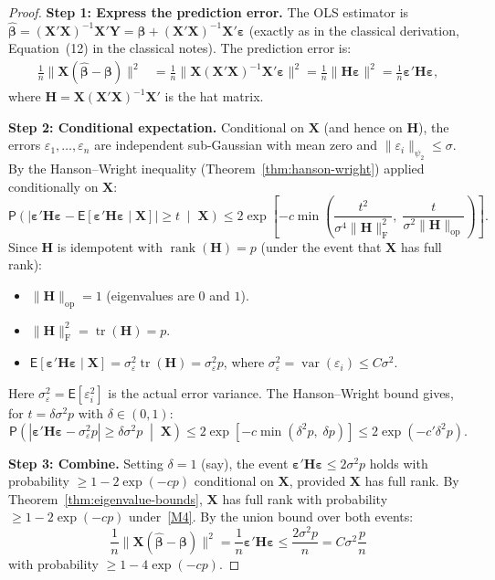 \documentclass[14pt]{extarticle}
\theoremstyle{plain}
\theoremstyle{definition}
\theoremstyle{remark}
\newcommand\expc{\mathsf{E}}
\newcommand\prb{\mathsf{P}}
\DeclareMathOperator\var{var}
\DeclareMathOperator\tr{tr}
\DeclareMathOperator\rank{rank}
\newcommand{\bX}{\mathbf{X}}
\newcommand{\bY}{\mathbf{Y}}
\def\bb{\boldsymbol{\beta}}
\newcommand{\be}{\boldsymbol{\varepsilon}}
\newcommand{\bH}{\mathbf{H}}
\newcommand{\hbb}{\hat{\boldsymbol{\beta}}}
\newcommand{\opnorm}[1]{\|#1\|_{\mathrm{op}}}
\newcommand{\fnorm}[1]{\|#1\|_{\mathrm{F}}}
\begin{document}
\begin{proof}
\textbf{Step 1: Express the prediction error.} The OLS estimator is $\hbb = (\bX'\bX)^{-1}\bX'\bY = \bb + (\bX'\bX)^{-1}\bX'\be$ (exactly as in the classical derivation, Equation~(12) in the classical notes). The prediction error is:
\begin{align}
\frac{1}{n}\|\bX(\hbb - \bb)\|^2 &= \frac{1}{n}\|\bX(\bX'\bX)^{-1}\bX'\be\|^2 = \frac{1}{n}\|\bH\be\|^2 = \frac{1}{n}\be'\bH\be, \label{eq:pred-err-qf}
\end{align}
where $\bH = \bX(\bX'\bX)^{-1}\bX'$ is the hat matrix.

\textbf{Step 2: Conditional expectation.} Conditional on $\bX$ (and hence on $\bH$), the errors $\varepsilon_1, \ldots, \varepsilon_n$ are independent sub-Gaussian with mean zero and $\|\varepsilon_i\|_{\psi_2} \leqslant \sigma$. By the Hanson--Wright inequality (Theorem~\ref{thm:hanson-wright}) applied conditionally on $\bX$:
\[
\prb\!\left(\left|\be'\bH\be - \expc[\be'\bH\be \mid \bX]\right| \geqslant t \;\middle|\; \bX\right) \leqslant 2\exp\!\left[-c\min\!\left(\frac{t^2}{\sigma^4\fnorm{\bH}^2},\; \frac{t}{\sigma^2\opnorm{\bH}}\right)\right].
\]
Since $\bH$ is idempotent with $\rank(\bH) = p$ (under the event that $\bX$ has full rank):
\begin{itemize}
\item $\opnorm{\bH} = 1$ (eigenvalues are $0$ and $1$).
\item $\fnorm{\bH}^2 = \tr(\bH) = p$.
\item $\expc[\be'\bH\be \mid \bX] = \sigma_\varepsilon^2\tr(\bH) = \sigma_\varepsilon^2 p$, where $\sigma_\varepsilon^2 = \var(\varepsilon_i) \leqslant C\sigma^2$.
\end{itemize}
Here $\sigma_\varepsilon^2 = \expc[\varepsilon_i^2]$ is the actual error variance. The Hanson--Wright bound gives, for $t = \delta\sigma^2 p$ with $\delta \in (0,1)$:
\[
\prb\!\left(|\be'\bH\be - \sigma_\varepsilon^2 p| \geqslant \delta\sigma^2 p \;\middle|\; \bX\right) \leqslant 2\exp\!\left[-c\min(\delta^2 p,\; \delta p)\right] \leqslant 2\exp(-c'\delta^2 p).
\]

\textbf{Step 3: Combine.} Setting $\delta = 1$ (say), the event $\be'\bH\be \leqslant 2\sigma^2 p$ holds with probability $\geqslant 1 - 2\exp(-cp)$ conditional on $\bX$, provided $\bX$ has full rank. By Theorem~\ref{thm:eigenvalue-bounds}, $\bX$ has full rank with probability $\geqslant 1 - 2\exp(-cp)$ under~\ref{M4}. By the union bound over both events:
\[
\frac{1}{n}\|\bX(\hbb - \bb)\|^2 = \frac{1}{n}\be'\bH\be \leqslant \frac{2\sigma^2 p}{n} = C\sigma^2\frac{p}{n}
\]
with probability $\geqslant 1 - 4\exp(-cp)$.
\end{proof}
\end{document}
